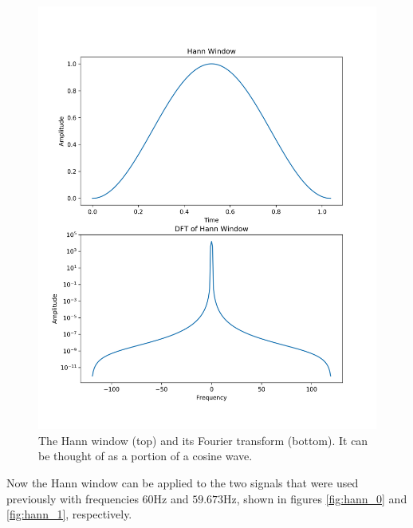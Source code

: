 \message{ !name(austin_report.tex)}\documentclass[11pt, letterpage]{article}
\begin{document}
\begin{figure}
  \includegraphics[width=\linewidth]{hann_window.png}
  \caption{
    The Hann window (top) and its Fourier transform (bottom). It can be thought
    of as a portion of a cosine wave.
  }
  \label{fig:hann_window}
\end{figure}

Now the Hann window can be applied to the two signals that were used previously
with frequencies $60$Hz and $59.673$Hz, shown in figures \ref{fig:hann_0} and
\ref{fig:hann_1}, respectively. 
\end{document}
